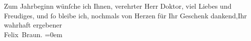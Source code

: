 \pstart
           Zum Jahrbeginn wünſche ich Ihnen, verehrter Herr Doktor, viel Liebes und
               Freudiges, und{ }ſo bleibe {\pb}ich, nochmals
               von Herzen für Ihr Geschenk dankend,\hspace*{1.5em}Ihr wahrhaft ergebener{\\[\baselineskip]}\spacefill\mbox{Felix Braun.}\pend
           \leftskip=0em{}\endnumbering{}  \newcommand{\dateiname}{L02494}\newcommand{\titel}{Felix Braun an Arthur Schnitzler, 25. 12. 1927}\newcommand{\editorInnen}{Martin Anton Müller und Gerd-Hermann Susen}
